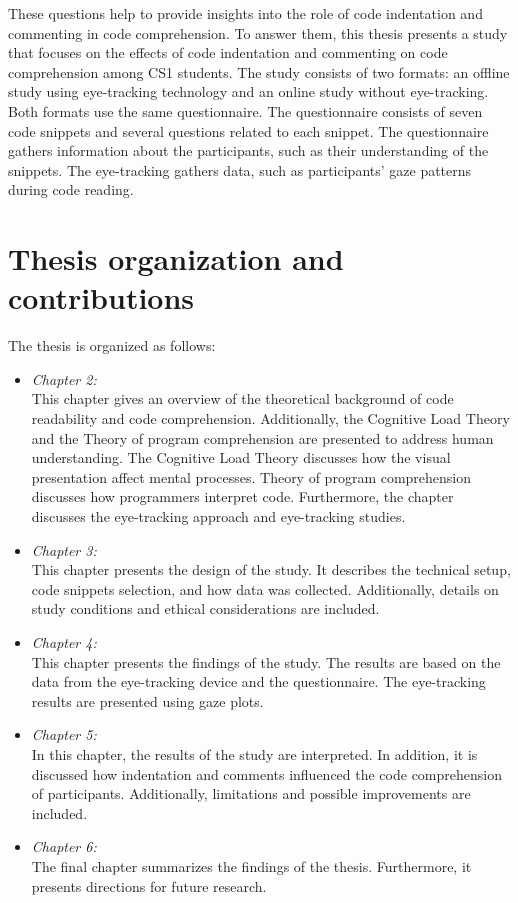 These questions help to provide insights into the role of code indentation and commenting in code comprehension. 
To answer them, this thesis presents a study that focuses on the effects of code indentation and commenting on code comprehension among CS1 students.
The study consists of two formats: an offline study using eye-tracking technology and an online study without eye-tracking. Both formats use the same questionnaire. The questionnaire consists of seven code snippets and several questions related to each snippet. The questionnaire gathers information about the participants, such as their understanding of the snippets. The eye-tracking gathers data, such as participants’ gaze patterns during code reading.  

\section{Thesis organization and contributions}

The thesis is organized as follows:
\begin{itemize}

\item[] \emph{Chapter 2:} 
\\This chapter gives an overview of the theoretical background of code readability and code comprehension. Additionally, the Cognitive Load Theory and the Theory of program comprehension are presented to address human understanding. The Cognitive Load Theory discusses how the visual presentation  affect mental processes. Theory of program comprehension discusses how programmers interpret code. 
Furthermore, the chapter discusses the eye-tracking approach and eye-tracking studies.  


\item[] \emph{Chapter 3:}
\\This chapter presents the design of the study. It describes the technical setup, code snippets selection, and how data was collected. Additionally, details on study conditions and ethical considerations are included.


\item[] \emph{Chapter 4:} 
\\ This chapter presents the findings of the study. The results are based on the data from the eye-tracking device and the questionnaire. The eye-tracking results are presented using gaze plots.


\item[] \emph{Chapter 5:} 
\\In this chapter, the results of the study are interpreted. In addition, it is discussed how indentation and comments influenced the code comprehension of participants. Additionally, limitations and possible improvements are included.

\item[] \emph{Chapter 6:} 
\\The final chapter summarizes the findings of the thesis. Furthermore, it presents directions for future research.

\end{itemize}


